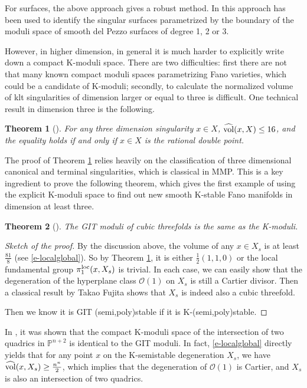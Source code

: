 \documentclass[12pt,reqno]{amsart}%
\newtheorem{thm}{Theorem}[section]
\theoremstyle{definition}
\theoremstyle{remark}
\newcommand{\hvol}{\widehat{\rm vol}}
\begin{document}
For surfaces, the above approach gives a robust method. In \cite{OSS16} this approach has been used to identify the singular surfaces parametrized by the boundary of the moduli space of smooth del Pezzo surfaces of degree 1, 2 or 3.  

 
However, in higher dimension, in general it is much harder to explicitly write down a compact K-moduli space. There are two difficulties: first there are not that many known compact moduli spaces parametrizing Fano varieties, which could be a candidate of K-moduli; secondly, to calculate the normalized volume of  klt singularities of dimension larger or equal to three is difficult. One technical result in dimension three is the following. 

\begin{thm}[\cite{LX19}]\label{t-threefold}
For any three dimension singularity $x\in X$, $\hvol(x,X)\le 16$, and the equality holds if and only if $x\in X$ is the rational double point.  
\end{thm}
The proof of Theorem \ref{t-threefold} relies heavily on the classification of three dimensional canonical and terminal singularities, which is classical in MMP. 
This is a key ingredient to prove the following theorem, which gives the first example of using the explicit K-moduli space to find out new smooth K-stable Fano manifolds in dimension at least three. 
\begin{thm}[{\cite{LX19}}]\label{t-cubics}
The GIT moduli of cubic threefolds is the same as the K-moduli.
\end{thm}
\begin{proof}[Sketch of the proof]By the discussion above, the volume of any $x\in X_s$ is at least $\frac{81}{8}$ (see \eqref{e-localglobal}). So by Theorem \ref{t-threefold},  it is either $\frac{1}{2}(1,1,0)$ or the local fundamental group ${\pi}_1^{\rm loc}(x,X_s)$ is trivial. In each  case, we can easily show that the degeneration of the hyperplane class $\mathcal{O}(1)$ on  $X_s$ is still a Cartier divisor. Then a classical result by Takao Fujita shows that $X_s$ is indeed also a cubic threefold.

Then we know it is GIT (semi,poly)stable if it is K-(semi,poly)stable. 
\end{proof}
In \cite{SS17}, it was shown that the compact  K-moduli space of the intersection of two quadrics in $\mathbb{P}^{n+2}$ is identical to the GIT moduli. In fact, \eqref{e-localglobal} directly yields that for any point $x$ on the K-semistable degeneration $X_s$,  we have $\hvol(x, X_s)\ge \frac{n^n}{2}$, which implies that the degeneration of $\mathcal{O}(1)$ is Cartier, and $X_s$ is also an intersection of two quadrics. 
\end{document}
